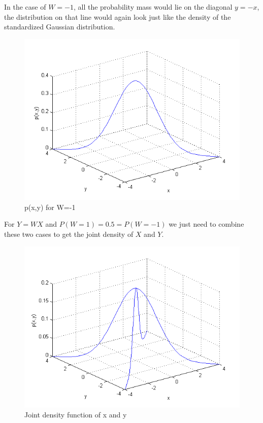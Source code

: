 \documentclass[paper=a4,fontsize=10pt,DIV11,BCOR10mm]{scrartcl}
\begin{document}
In the case of $W=-1$, all the probability mass would lie on the diagonal $y=-x$, the distribution on that line  would again look just like the density of the standardized Gaussian distribution.
\begin{figure}[htb]
\includegraphics[scale=0.6]{prob_dist_wneg.png}
\caption{p(x,y) for W=-1}
\end{figure}
\FloatBarrier

For $Y=WX$ and $P(W=1)=0.5=P(W=-1)$ we just need to combine these two cases to get the joint density of $X$ and $Y$.
\begin{figure}[htb]
\includegraphics[scale=0.6]{prob_dist.png} %
\caption{Joint density function of x and y}
\end{figure}
\FloatBarrier
\end{document}
